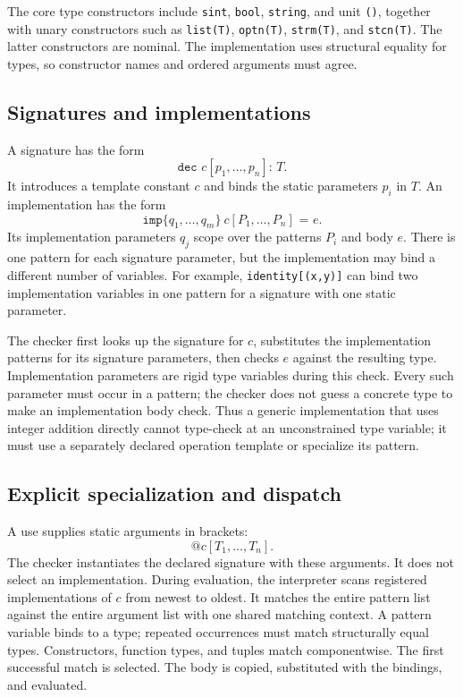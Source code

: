 \documentclass[11pt]{article}
\begin{document}
The core type constructors include \texttt{sint}, \texttt{bool},
\texttt{string}, and unit \texttt{()}, together with unary constructors such
as \texttt{list(T)}, \texttt{optn(T)}, \texttt{strm(T)}, and
\texttt{stcn(T)}. The latter constructors are nominal. The implementation
uses structural equality for types, so constructor names and ordered
arguments must agree.

\subsection{Signatures and implementations}

A signature has the form
\[
  \texttt{dec } c[p_1,\ldots,p_n]\texttt{: }T.
\]
It introduces a template constant \(c\) and binds the static parameters
\(p_i\) in \(T\). An implementation has the form
\[
  \texttt{imp}\{q_1,\ldots,q_m\}\ c[P_1,\ldots,P_n]
  \texttt{ = }e.
\]
Its implementation parameters \(q_j\) scope over the patterns \(P_i\) and
body \(e\). There is one pattern for each signature parameter, but the
implementation may bind a different number of variables. For example,
\texttt{identity[(x,y)]} can bind two implementation variables in one pattern
for a signature with one static parameter.

The checker first looks up the signature for \(c\), substitutes the
implementation patterns for its signature parameters, then checks \(e\)
against the resulting type. Implementation parameters are rigid type
variables during this check. Every such parameter must occur in a pattern;
the checker does not guess a concrete type to make an implementation body
check. Thus a generic implementation that uses integer addition directly
cannot type-check at an unconstrained type variable; it must use a separately
declared operation template or specialize its pattern.

\subsection{Explicit specialization and dispatch}

A use supplies static arguments in brackets:
\[
  \texttt{@}c[T_1,\ldots,T_n].
\]
The checker instantiates the declared signature with these arguments. It does
not select an implementation. During evaluation, the interpreter scans
registered implementations of \(c\) from newest to oldest. It matches the
entire pattern list against the entire argument list with one shared matching
context. A pattern variable binds to a type; repeated occurrences must match
structurally equal types. Constructors, function types, and tuples match
componentwise. The first successful match is selected. The body is copied,
substituted with the bindings, and evaluated.
\end{document}
